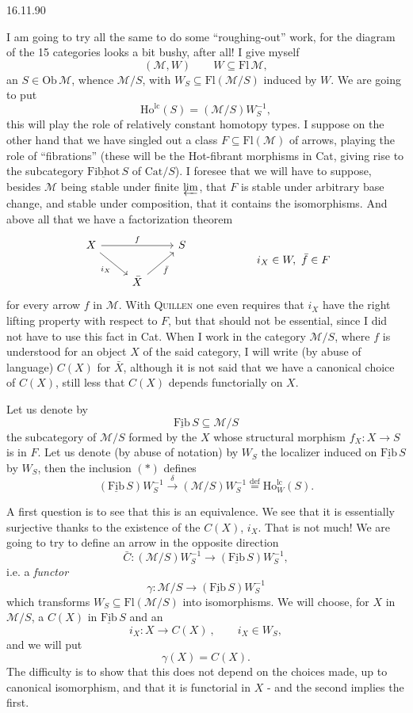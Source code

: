 \documentclass[11pt]{article}
\newcommand{\printedpage}[1]{\marginpar{\footnotesize p.~#1}}
\newcommand{\msp}[1]{\marginpar{\footnotesize [#1]}}
\newcommand{\cM}{\mathcal{M}}
\newcommand{\Fib}{\underline{\mathrm{Fib}}\,}
\newcommand{\Fibhot}{\underline{\mathrm{Fibhot}}\,}
\newcommand{\Ho}{\mathrm{Ho}}
\newcommand{\Fl}{\mathrm{Fl}}
\newcommand{\Ob}{\mathrm{Ob}}
\begin{document}
\printedpage{54}

\begin{flushright}
16.11.90
\end{flushright}

I am going to try all the same to do some ``roughing-out'' work, for the diagram of the
15 categories looks a bit bushy, %
after all! I give myself
\[
(\cM,W) \qquad W\subseteq \Fl\,\cM,
\]
an $S\in\Ob\,\cM$, whence $\cM/S$, with $W_S\subseteq\Fl(\cM/S)$ induced by $W$. We are going to put
\[
\Ho^{\mathrm{lc}}(S)=(\cM/S)W_S^{-1},
\]
this will play the role of relatively constant homotopy types. I suppose on the other hand
that we have singled out a class $F\subseteq\Fl(\cM)$ of arrows, playing the role of ``fibrations'' (these
will be the Hot-fibrant morphisms in Cat, giving rise to the subcategory $\Fibhot S$
of $\mathrm{Cat}/S$). I foresee that we will have to
\msp{page 86}suppose, besides $\cM$ being stable under finite $\varprojlim$, that $F$ is stable under arbitrary base change,
and stable under composition, that it contains the isomorphisms. And above all that we
have a factorization theorem
\[
\begin{tikzcd}
X \arrow[rr, "f"] \arrow[dr, "i_X"'] & & S \\
& \bar{X} \arrow[ur, "\bar{f}"'] &
\end{tikzcd}
\qquad\qquad\qquad
i_X\in W,\ \bar{f}\in F
\]
for %
every arrow $f$ in $\cM$. With \textsc{Quillen} one even requires that $i_X$ have the right lifting
property with respect to $F$, but that should not be essential, since I did not
have to use this fact in Cat. When I work in the category $\cM/S$, where $f$ is
understood for an object $X$ of the said category, I will write (by abuse of language) $C(X)$ for $\bar{X}$,
although it is not said that we have a canonical choice of $C(X)$, still less that $C(X)$
depends functorially on $X$.

Let us denote by
\[
\Fib S\subseteq\cM/S \tag*{$(*)$}
\]
the subcategory of $\cM/S$ formed by the $X$ whose structural morphism $f_X:X\longrightarrow S$ is
in $F$. Let us denote (by abuse of notation) by $W_S$ the localizer induced on $\Fib S$ by $W_S$,
then the inclusion $(*)$ defines
\[
(\Fib S)W_S^{-1}\xrightarrow{\ \delta\ }(\cM/S)W_S^{-1}\overset{\text{def}}{=}\Ho^{\mathrm{lc}}_W(S).
\]

\msp{page 87}A first question is to see that this is an equivalence. We see that it is essentially
surjective thanks to the existence of the $C(X)$, $i_X$. That is not much! We are going to try to define
an arrow in the opposite direction
\[
\bar{C}:(\cM/S)W_S^{-1}\longrightarrow(\Fib S)W_S^{-1},
\]
\printedpage{55}
i.e. a \textit{functor}
\[
\gamma:\cM/S\longrightarrow(\Fib S)W_S^{-1}
\]
which transforms $W_S\subseteq\Fl(\cM/S)$ into isomorphisms. We will choose, for $X$ in $\cM/S$, a
$C(X)$ in $\Fib S$ and an
\[
i_X:X\longrightarrow C(X)\ , \qquad i_X\in W_S,
\]
and we will put
\[
\gamma(X)=C(X).
\]
The difficulty is to show that this does not depend on the choices made, up to canonical
isomorphism, and that it is functorial in $X$ - and the second implies the first.
\end{document}
